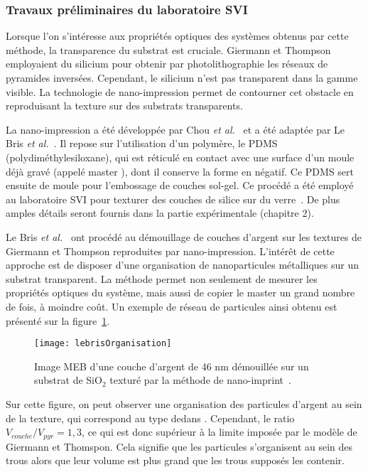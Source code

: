 		\subsubsection{Travaux préliminaires du laboratoire SVI}
Lorsque l'on s'intéresse aux propriétés optiques des systèmes obtenus par cette méthode, la transparence du substrat est cruciale. Giermann et Thompson employaient du silicium pour obtenir par photolithographie les réseaux de pyramides inversées. Cependant, le silicium n'est pas transparent dans la gamme visible. La technologie de nano-impression permet de contourner cet obstacle en reproduisant la texture sur des substrats transparents.\par 
La nano-impression a été développée par Chou \textit{et al.}~\cite{chou1996nanoimprint} et a été adaptée par Le Bris \textit{et al.}~\cite{le2014self}. Il repose sur l'utilisation d'un polymère, le PDMS (polydiméthylesiloxane), qui est réticulé en contact avec une surface d'un moule déjà gravé (appelé \og master \fg), dont il conserve la forme en négatif. Ce PDMS sert ensuite de moule pour l'embossage de couches sol-gel. Ce procédé a été employé au laboratoire SVI pour texturer des couches de silice sur du verre~\cite{dubov2013superhydrophobic}. De plus amples détails seront fournis dans la partie expérimentale (chapitre 2).\par 
Le Bris \textit{et al.}~\cite{le2014self} ont procédé au démouillage de couches d'argent sur les textures de Giermann et Thompson reproduites par nano-impression. L'intérêt de cette approche est de disposer d'une organisation de nanoparticules métalliques sur un substrat transparent. La méthode permet non seulement de mesurer les propriétés optiques du système, mais aussi de copier le master un grand nombre de fois, à moindre coût. Un exemple de réseau de particules ainsi obtenu est présenté sur la figure~\ref{lebrisOrganisation}.\par 
\begin{figure}[!htb]
	\centering
	\texttt{[image: lebrisOrganisation]}
	\caption{Image MEB d'une couche d'argent de 46 nm démouillée sur un substrat de SiO$_2$ texturé par la méthode de nano-imprint~\cite{le2014self}.}
	\label{lebrisOrganisation}
\end{figure}
Sur cette figure, on peut observer une organisation des particules d'argent au sein de la texture, qui correspond au type \og dedans \fg. Cependant, le ratio $V_{couche}/V_{pyr} = 1,3$, ce qui est donc supérieur à la limite imposée par le modèle de Giermann et Thomspon. Cela signifie que les particules s'organisent au sein des trous alors que leur volume est plus grand que les trous supposés les contenir.\par 

